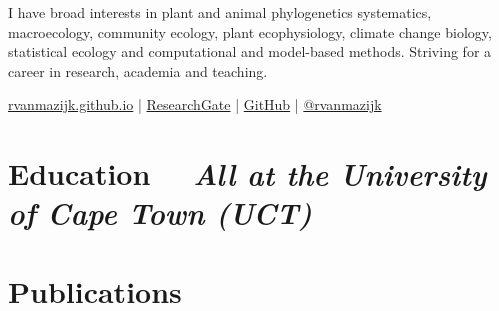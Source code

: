 \documentclass[10pt]{article}
\begin{document}


\bigskip \bigskip

I have broad interests in plant and animal phylogenetics systematics, 
macroecology, community ecology, plant ecophysiology, climate change biology, 
statistical ecology and computational and model-based methods. Striving for a 
career in research, academia and teaching.

\bigskip




\href{https://rvanmazijk.github.io/}{rvanmazijk.github.io} |
  \href{https://www.researchgate.net/profile/Ruan_Van_Mazijk/}{ResearchGate} |
  \href{https://github.com/rvanmazijk/}{GitHub} |
  \href{https://twitter.com/rvanmazijk/}{@rvanmazijk}






\hrulefill

\section*{Education %
  ~~{\small \textmd{\textit{All at the University of Cape Town (UCT)}}}}



\section*{Publications} %
\end{document}

